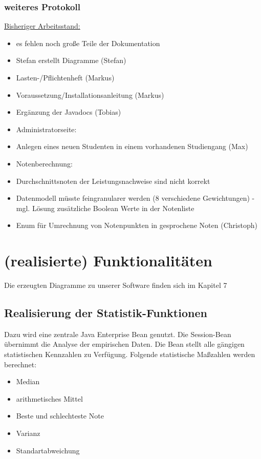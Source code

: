 \documentclass[12pt,a4paper,parskip]{scrreprt}
\begin{document}
\subsection{weiteres Protokoll}
\underline{Bisheriger Arbeitsstand:}
\begin{itemize}
	\item es fehlen noch große Teile der Dokumentation
\item Stefan erstellt Diagramme (Stefan)
\item Lasten-/Pflichtenheft (Markus)
\item Voraussetzung/Installationsanleitung (Markus)
\item Ergänzung der Javadocs (Tobias)
\item Administratorseite:
\item Anlegen eines neuen Studenten in einem vorhandenen Studiengang (Max)
\item Notenberechnung:
\item Durchschnittsnoten der Leistungsnachweise sind nicht korrekt
\item Datenmodell müsste feingranularer werden (8 verschiedene Gewichtungen)			- mgl. Lösung zusätzliche Boolean Werte in der Notenliste
\item Enum für Umrechnung von Notenpunkten in gesprochene Noten (Christoph)
\end{itemize}
\chapter{(realisierte) Funktionalitäten}
Die erzeugten Diagramme zu unserer Software finden sich im Kapitel 7
\section{Realisierung der Statistik-Funktionen}

Dazu wird eine zentrale Java Enterprise Bean genutzt. Die Session-Bean  übernimmt die Analyse der empirischen Daten. Die Bean stellt alle gängigen statistischen Kennzahlen zu Verfügung.
Folgende statistische Maßzahlen werden berechnet:
\begin{itemize}
	\item Median
	\item arithmetisches Mittel
	\item Beste und schlechteste Note
	\item Varianz
	\item Standartabweichung
\end{itemize}
\end{document}
